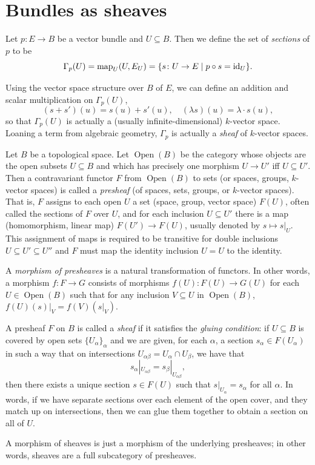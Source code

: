 \documentclass[a4paper,openany]{scrbook}
\DeclareMathOperator{\Open}{Open}
\begin{document}
\section{Bundles as sheaves} \label{sec:bundlesassheaves}

\begin{defn}
Let $p\colon E \to B$ be a vector bundle and $U \subseteq B$. Then we define the set of \emph{sections} of $p$ to be
\[
\Gamma_p(U) = \operatorname{map}_U(U,E_U) = \{s\colon U \to E \mid p \circ s = \operatorname{id}_U\}.
\]
\end{defn}
Using the vector space structure over $B$ of $E$, we can define an addition and scalar multiplication on $\Gamma_p(U)$,
\[
(s+s')(u) = s(u)+s'(u), \quad (\lambda s)(u) = \lambda \cdot s(u),
\]
so that $\Gamma_p(U)$ is actually a (usually infinite-dimensional) $k$-vector space. Loaning a term from algebraic geometry, $\Gamma_p$ is actually a \emph{sheaf} of $k$-vector spaces.

\begin{defn}
Let $B$ be a topological space. Let $\Open(B)$ be the category whose objects are the open subsets $U \subseteq B$ and which has precisely one morphism $U \to U'$ iff $U \subseteq U'$. Then a contravariant functor $F$ from $\Open(B)$ to sets (or spaces, groups, $k$-vector spaces) is called a \emph{presheaf} (of spaces, sets, groups, or $k$-vector spaces). That is, $F$ assigns to each open $U$ a set (space, group, vector space) $F(U)$, often called the sections of $F$ over $U$, and for each inclusion $U \subseteq U'$ there is a map (homomorphism, linear map) $F(U') \to F(U)$, usually denoted by $s \mapsto s|_U$. This assignment of maps is required to be transitive for double inclusions $U \subseteq U' \subseteq U''$ and $F$ must map the identity inclusion $U = U$ to the identity.

A \emph{morphism of presheaves} is a natural transformation of functors. In other words, a morphism $f\colon F \to G$ consists of morphisms $f(U)\colon F(U) \to G(U)$ for each $U \in \Open(B)$ such that for any inclusion $V \subseteq U$ in $\Open(B)$, $f(U)(s)|_V = f(V)(s|_V)$.

A presheaf $F$ on $B$ is called a \emph{sheaf} if it satisfies the \emph{gluing condition}: if $U \subseteq B$ is covered by open sets $\{U_\alpha\}_\alpha$ and we are given, for each $\alpha$, a section $s_\alpha \in F(U_\alpha)$ in such a way that on intersections $U_{\alpha\beta} = U_\alpha \cap U_\beta$, we have that
\[
s_\alpha|_{U_{\alpha\beta}} = s_\beta|_{U_{\alpha\beta}},
\]
then there exists a unique section $s \in F(U)$ such that $s|_{U_\alpha} = s_\alpha$ for all $\alpha$. In words, if we have separate sections over each element of the open cover, and they match up on intersections, then we can glue them together to obtain a section on all of $U$.

A morphism of sheaves is just a morphism of the underlying presheaves; in other words, sheaves are a full subcategory of presheaves.
\end{defn}
\end{document}
